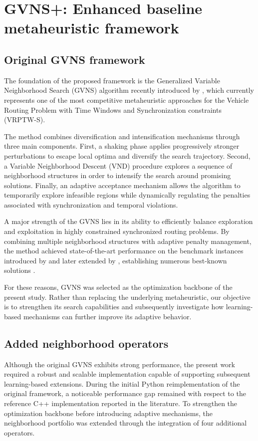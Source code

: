 \section{GVNS+: Enhanced baseline metaheuristic framework}
\label{sec:baseline}

\subsection{Original GVNS framework}
The foundation of the proposed framework is the Generalized Variable Neighborhood Search (GVNS) algorithm recently introduced by \citet{masmoudi2025generalized}, which currently represents one of the most competitive metaheuristic approaches for the Vehicle Routing Problem with Time Windows and Synchronization constraints (VRPTW-S).

The method combines diversification and intensification mechanisms through three main components. First, a shaking phase applies progressively stronger perturbations to escape local optima and diversify the search trajectory. Second, a Variable Neighborhood Descent (VND) procedure explores a sequence of neighborhood structures in order to intensify the search around promising solutions. Finally, an adaptive acceptance mechanism allows the algorithm to temporarily explore infeasible regions while dynamically regulating the penalties associated with synchronization and temporal violations.

A major strength of the GVNS lies in its ability to efficiently balance exploration and exploitation in highly constrained synchronized routing problems. By combining multiple neighborhood structures with adaptive penalty management, the method achieved state-of-the-art performance on the benchmark instances introduced by \citet{bredstrom2008combined} and later extended by \citet{liu2019adaptive}, establishing numerous best-known solutions \citep{masmoudi2025generalized}.

For these reasons, GVNS was selected as the optimization backbone of the present study. Rather than replacing the underlying metaheuristic, our objective is to strengthen its search capabilities and subsequently investigate how learning-based mechanisms can further improve its adaptive behavior.

\subsection{Added neighborhood operators}
Although the original GVNS exhibits strong performance, the present work required a robust and scalable implementation capable of supporting subsequent learning-based extensions. During the initial Python reimplementation of the original framework, a noticeable performance gap remained with respect to the reference C++ implementation reported in the literature. To strengthen the optimization backbone before introducing adaptive mechanisms, the neighborhood portfolio was extended through the integration of four additional operators.


